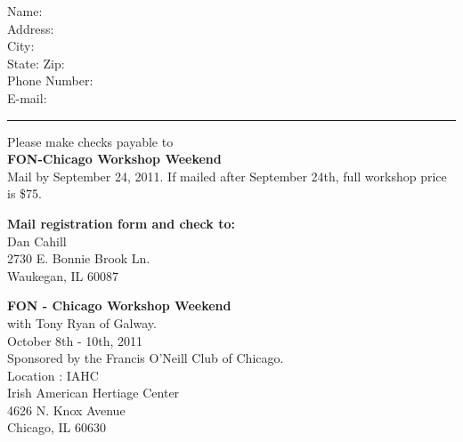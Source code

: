 \documentclass[letterpaper]{article}
\begin{document}
\begin{minipage}[h]{0.45\textwidth}
Name: \hrulefill{}\\

Address:  \hrulefill{}\\

City: \hrulefill{}\\

State: \hrulefill{} \hspace*{1em} Zip: \hrulefill{}\\

Phone Number: \hrulefill{}\\

E-mail: \hrulefill{}\\
\end{minipage}
\vspace*{2em}
\hrule
\vspace*{1em}
\begin{minipage}[b]{0.45\textwidth}
\vspace{0pt}
Please make checks payable to \\\textbf{FON-Chicago Workshop Weekend}\\Mail by September 24, 2011. If mailed after September 24th, full workshop price is \$75.


\vspace*{1em}

\hspace{0em}\textbf{Mail registration form and check to:}\\
Dan Cahill\\
2730 E. Bonnie Brook Ln.\\
Waukegan, IL 60087
\end{minipage}
\hfill
\begin{minipage}[b]{0.45\textwidth}
\vspace{0pt}
{\large\textbf{FON - Chicago Workshop Weekend}}\\ 

with Tony Ryan of Galway.\\October 8th - 10th, 2011\\ Sponsored by the Francis O'Neill Club of Chicago.\\

\vspace*{0.5em}
Location : IAHC\\
Irish American Hertiage Center\\
4626 N. Knox Avenue\\
Chicago, IL  60630
\end{minipage}
\end{document}

